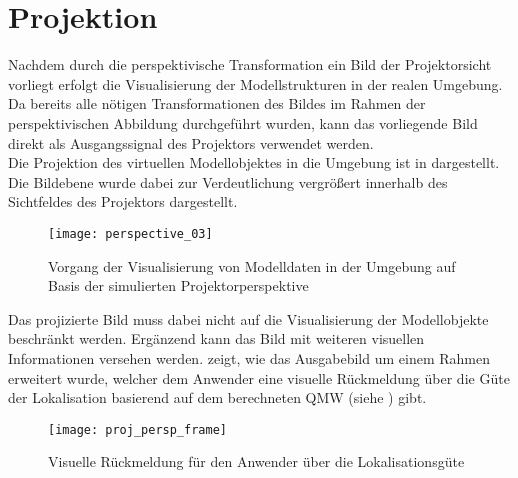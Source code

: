\section{Projektion}
Nachdem durch die perspektivische Transformation ein Bild der Projektorsicht vorliegt erfolgt die Visualisierung der Modellstrukturen in der realen Umgebung. Da bereits alle nötigen Transformationen des Bildes im Rahmen der perspektivischen Abbildung durchgeführt wurden, kann das vorliegende Bild direkt als Ausgangssignal des Projektors verwendet werden.\\
Die Projektion des virtuellen Modellobjektes in die Umgebung ist in  dargestellt. 
Die Bildebene wurde dabei zur Verdeutlichung vergrößert innerhalb des Sichtfeldes des Projektors dargestellt. 

\begin{figure}[!ht]
	\begin{center}
		\texttt{[image: perspective\_03]}
		\caption{Vorgang der Visualisierung von Modelldaten in der Umgebung auf Basis der simulierten Projektorperspektive}
		\label{fig.perspproj}
	\end{center}
\end{figure}

Das projizierte Bild muss dabei nicht auf die Visualisierung der Modellobjekte beschränkt werden. Ergänzend kann das Bild mit weiteren visuellen Informationen versehen werden.  zeigt, wie das Ausgabebild um einem Rahmen erweitert wurde, welcher dem Anwender eine visuelle Rückmeldung über die Güte der Lokalisation basierend auf dem berechneten QMW (siehe ) gibt.\\


\begin{figure}[!ht]
	\begin{center}
		\texttt{[image: proj\_persp\_frame]}
		\caption{Visuelle Rückmeldung für den Anwender über die Lokalisationsgüte}
		\label{fig.proj_rms}
	\end{center}
\end{figure}

